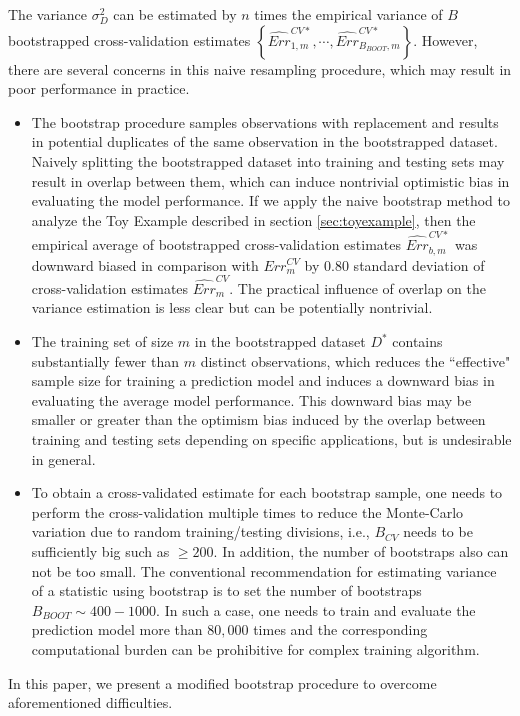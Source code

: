 \documentclass[12pt]{article}
\begin{document}
The variance $\sigma_D^2$ can be estimated by $n$ times the empirical variance of $B$ bootstrapped cross-validation estimates $\left\{\widehat{Err}_{1,m}^{CV*}, \cdots, \widehat{Err}_{B_{BOOT},m}^{CV*}\right\}.$  However, there are several concerns in this naive resampling procedure, which may result in poor performance in practice. 
\begin{itemize}
\item The bootstrap procedure samples observations with replacement and results in potential duplicates of the same observation in the bootstrapped dataset. Naively splitting the bootstrapped dataset into training and testing sets may result in overlap between them, which can induce nontrivial optimistic bias in evaluating the model performance. If we apply the naive bootstrap method to analyze the Toy Example described in section \ref{sec:toyexample}, then the empirical average of bootstrapped cross-validation estimates $\widehat{Err}_{b, m}^{CV*}$ was downward biased in comparison with  $Err_m^{CV}$ by 0.80 standard deviation of cross-validation estimates $\widehat{Err}_m^{CV}.$ The practical influence of overlap on the variance estimation is less clear but can be potentially nontrivial.
\item The training set of size $m$ in the bootstrapped dataset $D^*$ contains substantially fewer than $m$ distinct observations, which reduces the ``effective" sample size for training a prediction model and induces a downward bias in evaluating the average model performance. This downward bias may be smaller or greater than the optimism bias induced by the overlap between training and testing sets depending on specific applications, but is undesirable in general.
\item To obtain a cross-validated estimate for each bootstrap sample,  one needs to perform the cross-validation multiple times to reduce the Monte-Carlo variation due to random training/testing divisions, i.e., $B_{CV}$ needs to be sufficiently big such as $\ge 200.$  In addition, the number of bootstraps also can not be too small. The conventional recommendation for estimating variance of a statistic using bootstrap is to set the number of bootstraps $B_{BOOT}\sim 400-1000.$ In such a case, one needs to train and evaluate the prediction model more than $80,000$ times and the corresponding computational burden can be prohibitive for complex training algorithm.  
\end{itemize}

In this paper, we present a modified bootstrap procedure to overcome aforementioned difficulties.  
\end{document}
